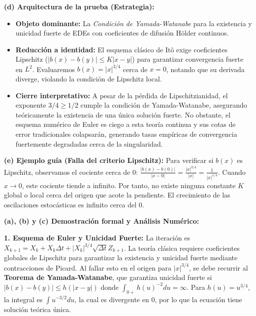 \documentclass[11pt, letterpaper]{article}
\begin{document}
\begin{solucion}
    \textbf{(d) Arquitectura de la prueba (Estrategia):}
    \begin{itemize}
        \item[(i)] \textbf{Objeto dominante:} La \textit{Condición de Yamada-Watanabe} para la existencia y unicidad fuerte de EDEs con coeficientes de difusión Hölder continuos.
        \item[(ii)] \textbf{Reducción a identidad:} El esquema clásico de Itô exige coeficientes Lipschitz ($|b(x)-b(y)| \le K|x-y|$) para garantizar convergencia fuerte en $L^2$. Evaluaremos $b(x) = |x|^{3/4}$ cerca de $x=0$, notando que su derivada diverge, violando la condición de Lipschitz local.
        \item[(iii)] \textbf{Cierre interpretativo:} A pesar de la pérdida de Lipschitzianidad, el exponente $3/4 \ge 1/2$ cumple la condición de Yamada-Watanabe, asegurando teóricamente la existencia de una única solución fuerte. No obstante, el esquema numérico de Euler es ciego a esta teoría continua y sus cotas de error tradicionales colapsarán, generando tasas empíricas de convergencia fuertemente degradadas cerca de la singularidad.
    \end{itemize}

    \vspace{3mm}
    \textbf{(e) Ejemplo guía (Falla del criterio Lipschitz):}
    Para verificar si $b(x)$ es Lipschitz, observamos el cociente cerca de 0:
    $\frac{|b(x) - b(0)|}{|x - 0|} = \frac{|x|^{3/4}}{|x|} = \frac{1}{|x|^{1/4}}$.
    Cuando $x \to 0$, este cociente tiende a infinito. Por tanto, no existe ninguna constante $K$ global o local cerca del origen que acote la pendiente. El crecimiento de las oscilaciones estocásticas es infinito cerca del 0.

    \textbf{(a), (b) y (c) Demostración formal y Análisis Numérico:}

    \textbf{1. Esquema de Euler y Unicidad Fuerte:}
    La iteración es $X_{k+1} = X_k + X_k \Delta t + |X_k|^{3/4} \sqrt{\Delta t} Z_{k+1}$.
    La teoría clásica requiere coeficientes globales de Lipschitz para garantizar la existencia y unicidad fuerte mediante contracciones de Picard. Al fallar esto en el origen para $|x|^{3/4}$, se debe recurrir al \textbf{Teorema de Yamada-Watanabe}, que garantiza unicidad fuerte si $|b(x) - b(y)| \le h(|x-y|)$ donde $\int_{0+} h(u)^{-2} du = \infty$.
    Para $h(u) = u^{3/4}$, la integral es $\int u^{-3/2} du$, la cual es divergente en $0$, por lo que la ecuación tiene solución teórica única.


\end{solucion}
\end{document}
